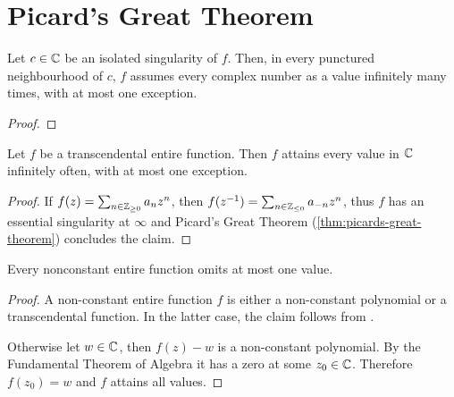 \section{Picard's Great Theorem}
\label{sec:picards-great-theorem}

\begin{theorem} \label{thm:picards-great-theorem}
    Let $c \in \mathbb{C}$ be an isolated singularity of $f$. Then, in every punctured neighbourhood of $c$, $f$ assumes every complex number as a value infinitely many times, with at most one exception.
\end{theorem}

\begin{proof}
\end{proof}

\begin{corollary} \label{cor:transcendental-every-value-inf}
    Let $f$ be a transcendental entire function. Then $f$ attains every value in $\mathbb{C}$ infinitely often, with at most one exception.
\end{corollary}

\begin{proof}
    If $f(z) = \sum_{n \in \mathbb{Z}_{\geq 0}} a_n z^n$, then $f(z^{-1}) = \sum_{n \in \mathbb{Z}_{\leq 0}} a_{-n} z^{n}$, thus $f$ has an essential singularity at $\infty$ and Picard's Great Theorem (\ref{thm:picards-great-theorem}) concludes the claim.
\end{proof}

\begin{corollary} \label{thm:picards-little-theorem}
    Every nonconstant entire function omits at most one value.
\end{corollary}

\begin{proof}
    A non-constant entire function $f$ is either a non-constant polynomial or a transcendental function. In the latter case, the claim follows from .
    
    Otherwise let $w \in \mathbb{C}$, then $f(z) - w$ is a non-constant polynomial. By the Fundamental Theorem of Algebra it has a zero at some $z_0 \in \mathbb{C}$. Therefore $f(z_0) = w$ and $f$ attains all values.
\end{proof}